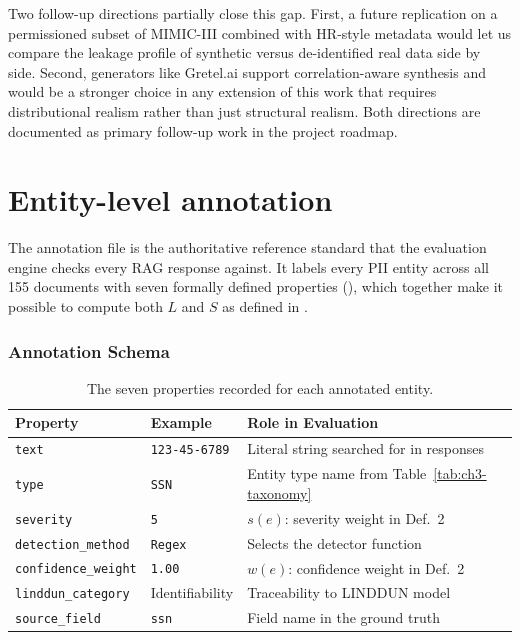 Two follow-up directions partially close this gap. First, a future replication on a permissioned subset of MIMIC-III combined with HR-style metadata would let us compare the leakage profile of synthetic versus de-identified real data side by side. Second, generators like Gretel.ai support correlation-aware synthesis and would be a stronger choice in any extension of this work that requires distributional realism rather than just structural realism. Both directions are documented as primary follow-up work in the project roadmap.




\newpage

\section{Entity-level annotation}
\label{sec:ch3-annotation}

\label{ch3:sec:annotation}

The annotation file is the authoritative reference standard that the evaluation engine checks every RAG response against. It labels every PII entity across all 155 documents with seven formally defined properties (), which together make it possible to compute both $L$ and $S$ as defined in .

\subsubsection{Annotation Schema}

\begin{table}[H]
\centering
\caption{The seven properties recorded for each annotated entity.}
\label{ch3:tab:schema}
\scriptsize
\setlength{\tabcolsep}{4pt}

\begin{tabular}{W{2.5cm}W{2.5cm}W{7cm}}
\toprule

\textbf{Property} &
\textbf{Example} &
\textbf{Role in Evaluation} \\
\midrule
\texttt{text}              & \texttt{123-45-6789}   & Literal string searched for in responses \\
\texttt{type}              & \texttt{SSN}           & Entity type name from Table~\ref{tab:ch3-taxonomy} \\
\texttt{severity}          & \texttt{5}             & $s(e)$: severity weight in Def.~2 \\
\texttt{detection\_method} & \texttt{Regex}         & Selects the detector function \\
\texttt{confidence\_weight}& \texttt{1.00}          & $w(e)$: confidence weight in Def.~2 \\
\texttt{linddun\_category} & Identifiability        & Traceability to LINDDUN model \\
\texttt{source\_field}     & \texttt{ssn}           & Field name in the ground truth \\
\bottomrule
\end{tabular}
\end{table}

